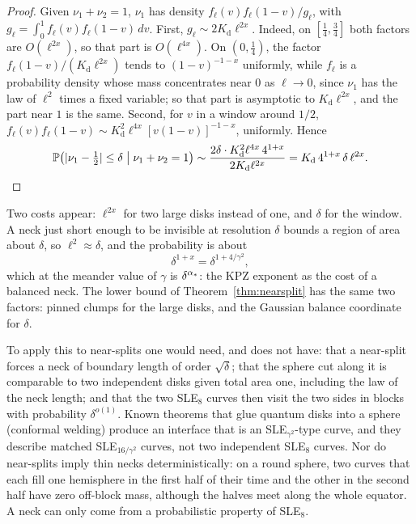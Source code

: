 \begin{proof}
Given $\nu_1+\nu_2=1$, $\nu_1$ has density $f_\ell(v)f_\ell(1-v)/g_\ell$, with
$g_\ell=\int_0^1f_\ell(v)f_\ell(1-v)\,dv$. First, $g_\ell\sim2K_{\mathrm d}\ell^{2x}$. Indeed, on $[\frac14,\frac34]$ both
factors are $O(\ell^{2x})$, so that part is $O(\ell^{4x})$. On $(0,\frac14)$, the factor
$f_\ell(1-v)/(K_{\mathrm d}\ell^{2x})$ tends to $(1-v)^{-1-x}$ uniformly, while $f_\ell$ is a probability density
whose mass concentrates near $0$ as $\ell\to0$, since $\nu_1$ has the law of $\ell^2$ times a fixed
variable; so that part is asymptotic to $K_{\mathrm d}\ell^{2x}$, and the part near $1$ is the same. Second, for
$v$ in a window around $1/2$, $f_\ell(v)f_\ell(1-v)\sim K_{\mathrm d}^2\ell^{4x}[v(1-v)]^{-1-x}$, uniformly. Hence
\[
\mathbb{P}\bigl(|\nu_1-\tfrac12|\le\delta\;\big|\;\nu_1+\nu_2=1\bigr)\sim\frac{2\delta\cdot K_{\mathrm d}^2\ell^{4x}\,4^{1+x}}{2K_{\mathrm d}\ell^{2x}}
=K_{\mathrm d}\,4^{1+x}\,\delta\,\ell^{2x}.\qedhere
\]
\end{proof}

Two costs appear: $\ell^{2x}$ for two large disks instead of one, and $\delta$ for the window. A neck just short enough to be invisible
at resolution $\delta$ bounds a region of area about $\delta$, so $\ell^2\approx\delta$, and the
probability is about
\[
\delta^{1+x}=\delta^{1+4/\gamma^2},
\]
which at the meander value of $\gamma$ is $\delta^{\alpha_*}$: the KPZ exponent as the cost of a balanced
neck. The lower bound of Theorem~\ref{thm:nearsplit} has the same two factors: pinned clumps for the
large disks, and the Gaussian balance coordinate for $\delta$.

To apply this to near-splits one would need, and does not have: that a near-split forces a neck
of boundary length of order $\sqrt\delta$; that the sphere cut along it is comparable to two
independent disks given total area one, including the law of the neck length; and that the two
SLE$_8$ curves then visit the two sides in blocks with probability $\delta^{o(1)}$. Known theorems
that glue quantum disks into a sphere (conformal welding) produce an interface that is an
SLE$_{\gamma^2}$-type curve, and they describe matched SLE$_{16/\gamma^2}$ curves, not two
independent SLE$_8$ curves. Nor do near-splits imply thin necks
deterministically: on a round sphere, two curves that each fill one hemisphere in the first half of
their time and the other in the second half have zero off-block mass, although the halves meet
along the whole equator. A neck can only come from a probabilistic property of SLE$_8$.
